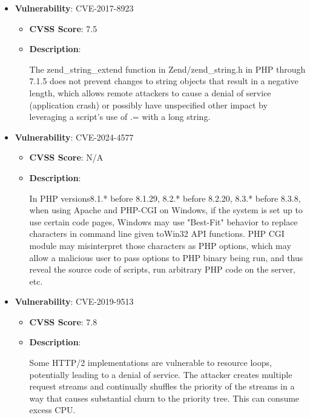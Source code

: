 \documentclass{article}
\begin{document}
\begin{itemize}
        \item \textbf{Vulnerability}: CVE-2017-8923
        \begin{itemize}
            \item \textbf{CVSS Score}:  7.5 
            \item \textbf{Description}:
            \parbox[t]{0.9\linewidth}{
                \ttfamily The zend\_string\_extend function in Zend/zend\_string.h in PHP through 7.1.5 does not prevent changes to string objects that result in a negative length, which allows remote attackers to cause a denial of service (application crash) or possibly have unspecified other impact by leveraging a script's use of .= with a long string.
            }
        \end{itemize}
    
        \item \textbf{Vulnerability}: CVE-2024-4577
        \begin{itemize}
            \item \textbf{CVSS Score}:  N/A 
            \item \textbf{Description}:
            \parbox[t]{0.9\linewidth}{
                \ttfamily In PHP versions8.1.* before 8.1.29, 8.2.* before 8.2.20, 8.3.* before 8.3.8, when using Apache and PHP-CGI on Windows, if the system is set up to use certain code pages, Windows may use "Best-Fit" behavior to replace characters in command line given toWin32 API functions. PHP CGI module may misinterpret those characters as PHP options, which may allow a malicious user to pass options to PHP binary being run, and thus reveal the source code of scripts, run arbitrary PHP code on the server, etc.
            }
        \end{itemize}
    
        \item \textbf{Vulnerability}: CVE-2019-9513
        \begin{itemize}
            \item \textbf{CVSS Score}:  7.8 
            \item \textbf{Description}:
            \parbox[t]{0.9\linewidth}{
                \ttfamily Some HTTP/2 implementations are vulnerable to resource loops, potentially leading to a denial of service. The attacker creates multiple request streams and continually shuffles the priority of the streams in a way that causes substantial churn to the priority tree. This can consume excess CPU.
            }
        \end{itemize}
    

\end{itemize}
\end{document}
